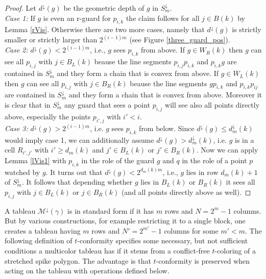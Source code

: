 \documentclass[a4paper,USenglish,numberwithinsect]{lipics}
\theoremstyle{plain}
\begin{document}
\begin{proof}
Let  $d^{\downarrow}(g)$ be the geometric
depth of  $g$ in $S_m^{\downarrow}$.
\\
{\em Case 1:} If $g$ is even an r-guard for $p_{i,k}$ the claim follows
for all  $j \in B(k)$
by Lemma \ref{rVis}. Otherwise there are two more cases, namely that
$d^{\downarrow}(g)$ is strictly smaller or strictly larger than
$2^{(i-1)m}$ (see Figure \ref{three_guard_pos}).
\\
{\em Case 2:} $d^{\downarrow}(g) < 2^{(i-1)m}$, i.e., $g$ sees  $p_{i,k}$
from above. If
 $g \in W_R(k)$ then $g$ can see all  $p_{i,j}$ with $j \in B_L(k)$ beause
the line segments $p_{i,j}p_{i,k}$ and  $p_{i,k}g$ are contained in
$S_m^{\downarrow}$
and they form a chain that is convex from above.
If $g \in W_L(k)$ then $g$ can see all  $p_{i,j}$ with $j \in B_R(k)$ beause
the line segments $gp_{i,k}$ and  $p_{i,k}p_{ij}$ are contained in
$S_m^{\downarrow}$
and they form a chain that is convex from above. Moreover it is clear
that in $S_m^{\downarrow}$
any guard that sees a point  $p_{i,j}$ will see also all points directly
above, especially
the points $p_{i',j}$ with $i'<i$.
\\
{\em Case 3:} $d^{\downarrow}(g)> 2^{(i-1)m }$, i.e. $g$ sees  $p_{i,k}$
from below.  
Since  $d^{\downarrow}(g) \leq d_m^{\downarrow}(k)$ would imply case 1,
we can additionally
assume  $d^{\downarrow}(g) > d_m^{\downarrow}(k)$, i.e. $g$
is in a cell
$R_{i',j'}$ with $i' \geq d_m(k)$ and $j' \in B_L(k)$ or $j' \in B_R(k)$.
Now we can apply Lemma \ref{lVis1} with $p_{i,k}$ in the role of the
guard $g$
and $q$ in the role of a point $p$ watched by $g$. It turns out  that
$d^{\downarrow}(g) < 2^{d_m(k)m}$, i.e., $g$ lies in row $d_m(k)+1$ of
$S_m^{\downarrow}$.
It follows that depending whether $g$ lies in $B_L(k)$ or $B_R(k)$
it sees all $p_{i,j}$ with $j \in B_L(k)$ or $j \in B_R(k)$ (and all
points directly above as well).
\end{proof}

A  tableau ${\mathcal M}^{\downarrow}(\gamma)$ is in 
standard form if it has  $m$ rows and $N=2^m-1$
columns. But by various constructions, for example restricting it to a single block, one creates  
a tableau having $m$ rows and $N'=2^{m'}-1$ columns for some $m'<m$.
The following definition of $t$-conformity specifies some necessary, but not sufficient conditions a multicolor tableau has if it stems 
from a conflict-free $t$-coloring  of a stretched spike polygon. The advantage is that $t$-conformity is preserved when acting on the tableau with 
operations defined below.
\end{document}
